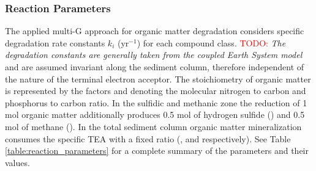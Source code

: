 \documentclass[gmd, manuscript]{copernicus}
\begin{document}
\subsubsection {Reaction Parameters}
The applied multi-G approach for organic matter degradation considers specific degradation rate constants $k_i$ (yr$^{-1}$) for each compound class. 
\textcolor{red}{TODO: } \textit{ The degradation constants are generally taken from the coupled Earth System model} 
and are assumed invariant along the sediment column, therefore independent of the nature of the terminal electron acceptor. 
The stoichiometry of organic matter is represented by the factors  and  denoting the molecular nitrogen to carbon and phosphorus to carbon ratio. 
In the sulfidic and methanic zone the 
reduction of 1 mol organic matter additionally produces 0.5 mol of hydrogen sulfide () and 0.5 mol of methane (). 
In the total sediment column organic matter mineralization consumes the specific TEA with a fixed ratio (,  and  respectively). 
See Table \ref{table:reaction_parameters} for a complete summary of the parameters and their values.
\end{document}

